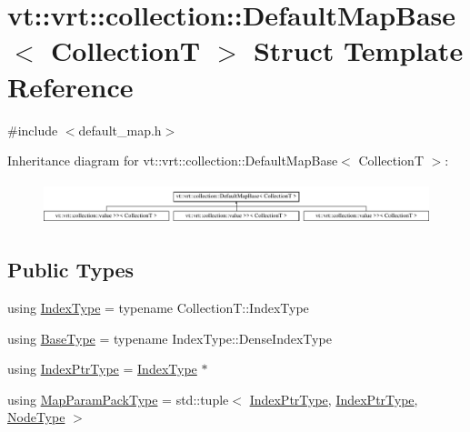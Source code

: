 \hypertarget{structvt_1_1vrt_1_1collection_1_1_default_map_base}{}\section{vt\+:\+:vrt\+:\+:collection\+:\+:Default\+Map\+Base$<$ CollectionT $>$ Struct Template Reference}
\label{structvt_1_1vrt_1_1collection_1_1_default_map_base}


{\ttfamily \#include $<$default\+\_\+map.\+h$>$}

Inheritance diagram for vt\+:\+:vrt\+:\+:collection\+:\+:Default\+Map\+Base$<$ CollectionT $>$\+:\begin{figure}[H]
\begin{center}
\leavevmode
\includegraphics[height=1.257015cm]{structvt_1_1vrt_1_1collection_1_1_default_map_base}
\end{center}
\end{figure}
\subsection*{Public Types}
\begin{DoxyCompactItemize}
\item 
using \hyperlink{structvt_1_1vrt_1_1collection_1_1_default_map_base_a88a872640fd6de6c456cb6eb9512665b}{Index\+Type} = typename Collection\+T\+::\+Index\+Type
\item 
using \hyperlink{structvt_1_1vrt_1_1collection_1_1_default_map_base_a171c2e994a586fa5d8e1213f7ebfda95}{Base\+Type} = typename Index\+Type\+::\+Dense\+Index\+Type
\item 
using \hyperlink{structvt_1_1vrt_1_1collection_1_1_default_map_base_a0a2460c532fc180c1aeb8b3b5d0df59e}{Index\+Ptr\+Type} = \hyperlink{structvt_1_1vrt_1_1collection_1_1_default_map_base_a88a872640fd6de6c456cb6eb9512665b}{Index\+Type} $\ast$
\item 
using \hyperlink{structvt_1_1vrt_1_1collection_1_1_default_map_base_a94765cd0fe916d073a01eba6eb796f8e}{Map\+Param\+Pack\+Type} = std\+::tuple$<$ \hyperlink{structvt_1_1vrt_1_1collection_1_1_default_map_base_a0a2460c532fc180c1aeb8b3b5d0df59e}{Index\+Ptr\+Type}, \hyperlink{structvt_1_1vrt_1_1collection_1_1_default_map_base_a0a2460c532fc180c1aeb8b3b5d0df59e}{Index\+Ptr\+Type}, \hyperlink{namespacevt_a866da9d0efc19c0a1ce79e9e492f47e2}{Node\+Type} $>$
\end{DoxyCompactItemize}


